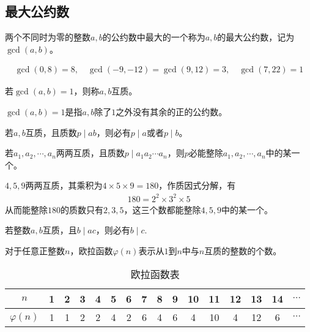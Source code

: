 \subsection{最大公约数}
\label{sec:gcd}

\begin{definition}
  两个不同时为零的整数$a,b$的公约数中最大的一个称为$a,b$的最大公约数，记为$\gcd(a,b)$。
\end{definition}

\begin{example}
  \begin{align*}
    \gcd(0,8)=8,\quad 
    \gcd(-9,-12)=\gcd(9,12)=3,\quad
    \gcd(7,22)=1
  \end{align*}
\end{example}

\begin{definition}[互质，Coprime]
  若$\gcd(a,b)=1$，则称$a,b$互质。
\end{definition}
$\gcd(a,b)=1$是指$a,b$除了$1$之外没有其余的正的公约数。

\begin{theorem}
  若$a,b$互质，且质数$p\mid ab$，则必有$p\mid a$或者$p\mid b$。
\end{theorem}
\begin{corollary}
  若$a_1,a_2,\cdots,a_n$两两互质，且质数$p\mid a_1a_2\cdots a_n$，则$p$必能整除$a_1,a_2,\cdots, a_n$中的某一个。
\end{corollary}

\begin{example}
  $4,5,9$两两互质，其乘积为$4\times5\times9=180$，作质因式分解，有
  \begin{align*}
    180=2^2\times 3^2\times 5
  \end{align*}
  从而能整除$180$的质数只有$2,3,5$，这三个数都能整除$4,5,9$中的某一个。
\end{example}

\begin{theorem}
  若整数$a,b$互质，且$b\mid ac$，则必有$b\mid c.$
\end{theorem}

\begin{definition}\label{def:Euler-function}
  对于任意正整数$n$，欧拉函数$\varphi(n)$表示从$1$到$n$中与$n$互质的整数的个数。
\end{definition}

\begin{table}[htbp]
  \centering
  \begin{tabular}{cccccccccccccccc}
    \toprule
    $n$          & 1 & 2 & 3 & 4 & 5 & 6 & 7 & 8 & 9 & 10 & 11 & 12 & 13 & 14 & $\cdots$\\\midrule
    $\varphi(n)$ & 1 & 1 & 2 & 2 & 4 & 2 & 6 & 4 & 6 & 4  & 10 & 4  & 12 & 6  & $\cdots$\\
    \bottomrule
  \end{tabular}
  \caption{欧拉函数表}
  \label{tab:Euler-function-values}
\end{table}

